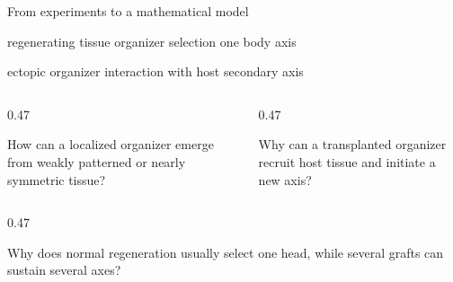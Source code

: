 \begin{frame}{From experiments to a mathematical model}

  \vspace{0.20cm}
  \HydraProcess
    {regenerating tissue}
    {organizer selection}
    {one body axis}

  \vspace{0.40cm}

  \HydraProcess
    {ectopic organizer}
    {interaction with host}
    {secondary axis}

  \vspace{0.95cm}

  \begin{columns}[T,onlytextwidth]

    \begin{column}{0.47\textwidth}
      \begin{minipage}[t][1.55cm][t]{\linewidth}
        \vspace{0pt}
          {How can a localized organizer emerge from weakly patterned or nearly symmetric tissue?}
      \end{minipage}
    \end{column}

    \begin{column}{0.47\textwidth}
      \begin{minipage}[t][1.55cm][t]{\linewidth}
        \vspace{0pt}
          {Why can a transplanted organizer recruit host tissue and initiate a new axis?}
      \end{minipage}
    \end{column}

  \end{columns}

  \vspace{0.38cm}

  \begin{columns}[T,onlytextwidth]

    \begin{column}{0.47\textwidth}
      \begin{minipage}[t][1.55cm][t]{\linewidth}
        \vspace{0pt}
          {Why does normal regeneration usually select one head, while several grafts can sustain several axes?}
      \end{minipage}
    \end{column}


\end{columns}
\end{frame}
